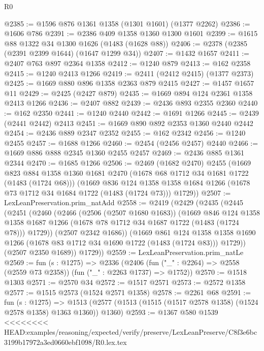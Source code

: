 \begin{lexlean}{R0}
\begin{coremodule}
{{{{{{{{{{{{{{{{{{{{{{{{{{{{{{{{{{{{{{{{{{{{{{{{{{{{{{{{{{{{{{{{{{{{{{{{{{{{{{{{{{{{{{@2385 := @1596 @876 @1361 @1358 (@1301 @1601) (@1377 @2262)
@2386 := @1606 @786
@2391 := @2386 @409 @1358 @1360 @1300 @1601
@2399 := @1615 @88 @1322 @34 @1300 @1626 (@1483 (@1628 @88))
@2406 := @2378 (@2385 (@2391 @2399 @1644) (@1647 @1299 @34))
@2407 := @1432 @1657
@2411 := @2407 @763 @897 @2364 @1358
@2412 := @1240 @879
@2413 := @162 @2358
@2415 := @1240 @2413 @1266
@2419 := @2411 (@2412 @2415) (@1377 @2373)
@2425 := @1669 @880 @896 @1358 @2363 @879 @2415
@2427 := @1457 @1657 @11
@2429 := @2425 (@2427 @879)
@2435 := @1669 @894 @124 @2361 @1358 @2413 @1266
@2436 := @2407 @882
@2439 := @2436 @893 @2355 @2360
@2440 := @162 @2350
@2441 := @1240 @2440
@2442 := @1691 @1266
@2445 := @2439 (@2441 @2442) @2413
@2451 := @1669 @890 @892 @2353 @1360 @2440 @2442
@2454 := @2436 @889 @2347 @2352
@2455 := @162 @2342
@2456 := @1240 @2455
@2457 := @1688 @1266
@2460 := @2454 (@2456 @2457) @2440
@2466 := @1669 @886 @888 @2345 @1360 @2455 @2457
@2469 := @2436 @885 @1361 @2344
@2470 := @1685 @1266
@2506 := @2469
    (@1682 @2470)
    @2455
    (@1669
      @823
      @884
      @1358
      @1360
      @1681
      @2470
      (@1678 @68 @1712 @34 @1681 @1722 (@1483 (@1724 @68)))
      (@1669
        @836
        @124
        @1358
        @1358
        @1684
        @1266
        (@1678 @73 @1712 @34 @1684 @1722 (@1483 (@1724 @73)))
        @1729))
@2507 := LexLeanPreservation.prim_natAdd
@2558 := @2419
    (@2429
      (@2435
        (@2445
          (@2451
            (@2460
              (@2466
                (@2506 (@2507 @1680 @1683))
                (@1669
                  @846
                  @124
                  @1358
                  @1358
                  @1687
                  @1266
                  (@1678 @78 @1712 @34 @1687 @1722 (@1483 (@1724 @78)))
                  @1729))
              (@2507 @2342 @1686))
            (@1669
              @861
              @124
              @1358
              @1358
              @1690
              @1266
              (@1678 @83 @1712 @34 @1690 @1722 (@1483 (@1724 @83)))
              @1729))
          (@2507 @2350 @1689))
        @1729))
@2559 := LexLeanPreservation.prim_natLe
@2569 := fun (s : @1275) =>
  @2336 (@2406 (fun ("_" : @2264) => @2558 (@2559 @73 @2358)) (fun ("_" : @2263 @1737) => @1752))
@2570 := @1518 @1303
@2571 := @2570 @34
@2572 := @1517 @2571
@2573 := @2572 @1358
@2577 := @1515 @2573 (@1524 @2571 @1358)
@2578 := @2261 @68
@2591 := fun (s : @1275) =>
  @1513 (@2577 (@1513 (@1515 (@1517 @2578 @1358) (@1524 @2578 @1358) @1363 @1360)) @1360)
@2593 := @1367 @580 @1539
<<<<<<<< HEAD:examples/reasoning/expected/verify/preserve/LexLeanPreserve/C8f3e6bc3199b17972a3ed0660ebf1098/R0.lex.tex
}}}}}}}}}}}}}}}}}}}}}}}}}}}}}}}}}}}}}}}}}}}}}}}}}}}}}}}}}}}}}}}}}}}}}}}}}}}}}}}}}}}}}}
\end{coremodule}
\end{lexlean}
